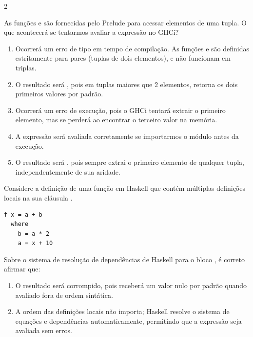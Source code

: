 \documentclass[a4paper,10pt,brazil]{article}
\begin{document}
\begin{multicols}{2}
\begin{enumerate}
\end{enumerate}

As funções  e  são fornecidas pelo Prelude para acessar elementos de uma tupla. O que acontecerá se tentarmos avaliar a expressão  no GHCi?

\begin{enumerate}
  \item Ocorrerá um erro de tipo em tempo de compilação. As funções  e  são definidas estritamente para pares (tuplas de dois elementos), e não funcionam em triplas.

  \item O resultado será , pois em tuplas maiores que 2 elementos,  retorna os dois primeiros valores por padrão.

  \item Ocorrerá um erro de execução, pois o GHCi tentará extrair o primeiro elemento, mas se perderá ao encontrar o terceiro valor na memória.

  \item A expressão será avaliada corretamente se importarmos o módulo  antes da execução.

  \item O resultado será , pois  sempre extrai o primeiro elemento de qualquer tupla, independentemente de sua aridade.


\end{enumerate}

Considere a definição de uma função  em Haskell que contém múltiplas definições locais na sua cláusula . 
\begin{verbatim}
f x = a + b
  where
    b = a * 2
    a = x + 10
\end{verbatim}
Sobre o sistema de resolução de dependências de Haskell para o bloco , é correto afirmar que:

\begin{enumerate}
  \item O resultado será corrompido, pois  receberá um valor nulo por padrão quando avaliado fora de ordem sintática.

  \item A ordem das definições locais não importa; Haskell resolve o sistema de equações e dependências automaticamente, permitindo que a expressão seja avaliada sem erros.


\end{enumerate}
\end{multicols}
\end{document}
